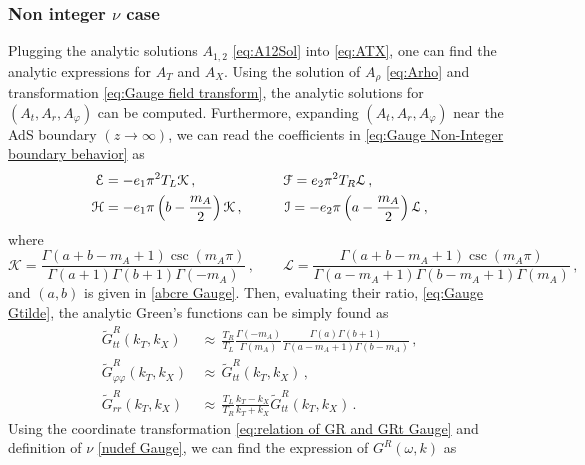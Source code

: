 \documentclass[11pt,a4paper]{article}
\newcommand{\ra}{\rightarrow}
\begin{document}
\subsubsection{Non integer $\nu$ case}
Plugging the analytic solutions $A_{1,2}$ \eqref{eq:A12Sol} into \eqref{eq:ATX}, one can find the analytic expressions for $A_T$ and $A_X$. Using the solution of $A_\rho$ \eqref{eq:Arho} and transformation \eqref{eq:Gauge field transform}, the analytic solutions for $(A_t, A_r, A_\varphi)$ can be computed. Furthermore, expanding $(A_t, A_r, A_\varphi)$ near the AdS boundary $(z \ra \infty)$, we can read the coefficients in \eqref{eq:Gauge Non-Integer boundary behavior} as
\begin{equation} \label{eq:Gauge Solution Behavior Non-Int}
\begin{aligned}
    \mathcal{E} & = -e_1 \pi^2 T_L \mathcal{K}\,,
    & \mathcal{F} = e_2 \pi^2 T_R \mathcal{L}\,, \hspace{1.4cm}\\
    \mathcal{H} & = -e_1 \pi \left( b-\frac{m_A}{2} \right) \mathcal{K}\,, \qquad
    &  \mathcal{I} = -e_2 \pi \left( a-\frac{m_A}{2} \right) \mathcal{L}\,,
\end{aligned}
\end{equation}
where
\begin{equation}
    \mathcal{K} = \frac{\Gamma(a+b-m_A+1) \csc( m_A \pi)}{\Gamma(a+1) \Gamma(b+1) \Gamma(-m_A)}\,, \qquad \mathcal{L} = \frac{\Gamma(a+b-m_A+1) \csc( m_A \pi)}{\Gamma(a-m_A+1) \Gamma(b-m_A+1) \Gamma(m_A)}\,,
\end{equation}
and $(a,b)$ is given in \eqref{abcre Gauge}. Then, evaluating their ratio, \eqref{eq:Gauge Gtilde}, the analytic Green's functions can be simply found as
\begin{equation}
\begin{aligned}
    \tilde{G}_{tt}^R(k_T, k_X) \, & \approx\, \frac{T_R}{T_L} \frac{\Gamma(-m_A)}{\Gamma(m_A)} \frac{\Gamma(a)\Gamma(b+1)}{\Gamma(a-m_A+1)\Gamma(b-m_A)}\,,\\
    \tilde{G}_{\varphi \varphi}^R(k_T, k_X) \, & \approx \, \tilde{G}_{tt}^R(k_T, k_X)\,,\\
    \tilde{G}_{rr}^R(k_T, k_X) \, & \approx\, \frac{T_L}{T_R}\frac{k_T-k_X}{k_T + k_X} \tilde{G}_{tt}^R(k_T, k_X)\,.
\end{aligned}
\end{equation}
Using the coordinate transformation \eqref{eq:relation of GR and GRt Gauge} and definition of $\nu$ \eqref{nudef Gauge}, we can find the expression of $G^R(\omega,k)$ as
\end{document}
